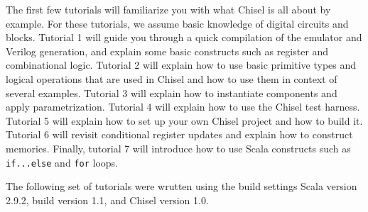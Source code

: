 The first few tutorials will familiarize you with what Chisel is all about by example. For these tutorials, we assume basic knowledge of digital circuits and blocks. 
Tutorial 1 will guide you through a quick compilation of the emulator and Verilog generation, and explain some basic constructs such as register and combinational logic. 
Tutorial 2 will explain how to use basic primitive types and logical operations that are used in Chisel and how to use them in context of several examples. 
Tutorial 3 will explain how to instantiate components and apply parametrization. 
Tutorial 4 will explain how to use the Chisel test harness. 
Tutorial 5 will explain how to set up your own Chisel project and how to build it.
Tutorial 6 will revisit conditional register updates and explain how to construct memories.
Finally, tutorial 7 will introduce how to use Scala constructs such as \verb+if...else+ and \verb+for+ loops.

The following set of tutorials were wrutten using the build settings Scala version 2.9.2, build version 1.1, and Chisel version 1.0.
